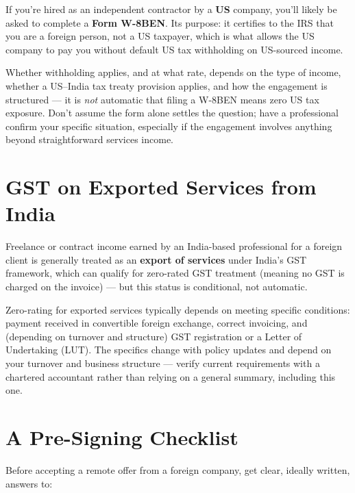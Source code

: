 If you're hired as an independent contractor by a \textbf{US} company, you'll likely be asked to complete a
\textbf{Form W-8BEN}. Its purpose: it certifies to the IRS that you are a foreign person, not a US taxpayer, which
is what allows the US company to pay you without default US tax withholding on US-sourced income.

\begin{caution}
Whether withholding applies, and at what rate, depends on the type of income, whether a US--India tax treaty
provision applies, and how the engagement is structured — it is \emph{not} automatic that filing a W-8BEN means
zero US tax exposure. Don't assume the form alone settles the question; have a professional confirm your specific
situation, especially if the engagement involves anything beyond straightforward services income.
\end{caution}

\section{GST on Exported Services from India}

Freelance or contract income earned by an India-based professional for a foreign client is generally treated as
an \textbf{export of services} under India's GST framework, which can qualify for zero-rated GST treatment
(meaning no GST is charged on the invoice) — but this status is conditional, not automatic.

\begin{caution}
Zero-rating for exported services typically depends on meeting specific conditions: payment received in
convertible foreign exchange, correct invoicing, and (depending on turnover and structure) GST registration or a
Letter of Undertaking (LUT). The specifics change with policy updates and depend on your turnover and business
structure — verify current requirements with a chartered accountant rather than relying on a general summary,
including this one.
\end{caution}

\section{A Pre-Signing Checklist}

Before accepting a remote offer from a foreign company, get clear, ideally written, answers to:

